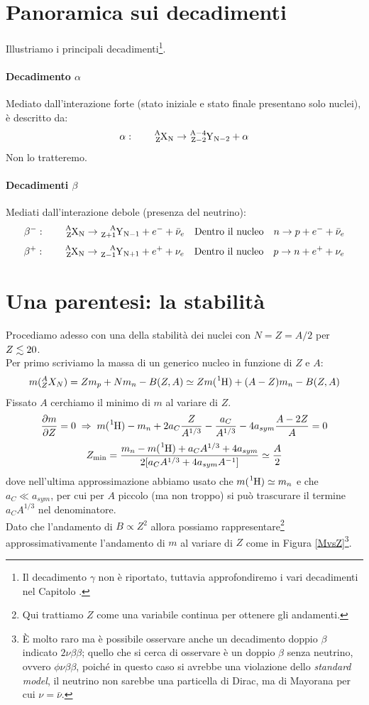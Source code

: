 \newpage

\section{Panoramica sui decadimenti}
Illustriamo i principali decadimenti\footnote{Il decadimento $\gamma$ non è riportato, tuttavia approfondiremo i vari decadimenti nel Capitolo .}.

\paragraph{Decadimento $\alpha$} Mediato dall'interazione forte (stato iniziale e stato finale presentano solo nuclei), è descritto da:
$$\alpha: \qquad \ce{^A_ZX_N} \to \ce{^{A-4}_{Z-2}Y_{N-2}} + \alpha $$
Non lo tratteremo.
\paragraph{Decadimenti $\beta$} Mediati dall'interazione debole (presenza del neutrino):
$$\beta^-: \qquad \ce{^A_ZX_N} \to \ce{^{A}_{Z+1}Y_{N-1}} + e^- + \bar{\nu}_e \quad \text{Dentro il nucleo}\quad n \to p + e^- + \bar{\nu}_e $$
$$\beta^+: \qquad \ce{^A_ZX_N} \to \ce{^{A}_{Z-1}Y_{N+1}} + e^+ + \nu_e \quad \text{Dentro il nucleo}\quad p \to n + e^+ + \nu_e$$

\section{Una parentesi: la stabilità}
Procediamo adesso con una  della stabilità dei nuclei con $N=Z=A/2$ per $Z\lesssim 20$.\\
Per primo scriviamo la massa di un generico nucleo in funzione di $Z$ e $A$:
$$m(\nuc{X}{A}{Z}{N}) = Zm_p + Nm_n - B(Z,A) \simeq Z m(\ce{^1H}) + (A-Z)m_n- B(Z,A)$$
Fissato $A$ cerchiamo il minimo di $m$ al variare di $Z$.
$$\frac{\partial m}{\partial Z} = 0 \;\Rightarrow\; m(\ce{^1H})-m_n + 2a_C \frac{Z}{A^{1/3}} - \frac{a_C}{A^{1/3}}-4a_{sym}\frac{A-2Z}{A} = 0$$
$$Z_{\min} = \frac{m_n - m(\ce{^1H})+a_C A^{1/3}+4 a_{sym}}{2[a_CA^{1/3}+4a_{sym}A^{-1}]}\simeq \frac{A}{2}$$
dove nell'ultima approssimazione abbiamo usato che $m(\ce{^1H})\simeq m_n$ e che $a_C\ll a_{sym}$, per cui per $A$ piccolo (ma non troppo) si può trascurare il termine $a_C A^{1/3}$ nel denominatore.\\
Dato che l'andamento di $B\propto Z^2$ allora possiamo rappresentare\footnote{Qui trattiamo $Z$ come una variabile continua per ottenere gli andamenti.} approssimativamente l'andamento di $m$ al variare di $Z$ come in Figura \ref{MvsZ}\footnote{È molto raro ma è possibile osservare anche un decadimento doppio $\beta$ indicato $2\nu\beta\beta$; quello che si cerca di osservare è un doppio $\beta$ senza neutrino, ovvero $\phi \nu \beta\beta$, poiché in questo caso si avrebbe una violazione dello \textit{standard model}, il neutrino non sarebbe una particella di Dirac, ma di Mayorana per cui $\nu = \bar{\nu}$.}.

